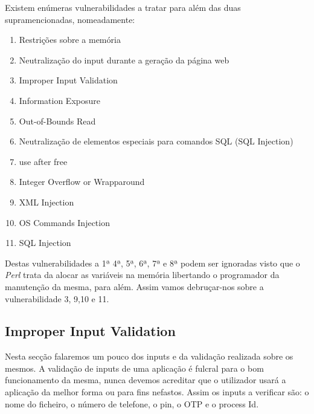 Existem enúmeras vulnerabilidades a tratar para além das duas supramencionadas, nomeadamente:
\begin{enumerate}
\item Restrições sobre a memória
\item Neutralização do input durante a geração da página web
\item Improper Input Validation
\item Information Exposure
\item Out-of-Bounds Read
\item Neutralização de elementos especiais para comandos SQL (SQL Injection)
\item use after free
\item Integer Overflow or Wrapparound
\item XML Injection
\item OS Commands Injection
\item SQL Injection
\end{enumerate}

Destas vulnerabilidades a 1ª 4ª, 5ª, 6ª, 7ª e 8ª podem ser ignoradas visto que o \textit{Perl} trata da alocar as variáveis na memória libertando o programador da manutenção da mesma, para além. Assim vamos debruçar-nos sobre a vulnerabilidade 3, 9,10 e 11.


\subsection{Improper Input Validation}

Nesta secção falaremos um pouco dos inputs e da validação realizada sobre os mesmos. A validação de inputs de uma aplicação é fulcral para o bom funcionamento da mesma, nunca devemos acreditar que o utilizador usará a aplicação da melhor forma ou para fins nefastos.\newline
Assim os inputs a verificar são: o nome do ficheiro, o número de telefone, o pin, o OTP e o process Id.\newline

